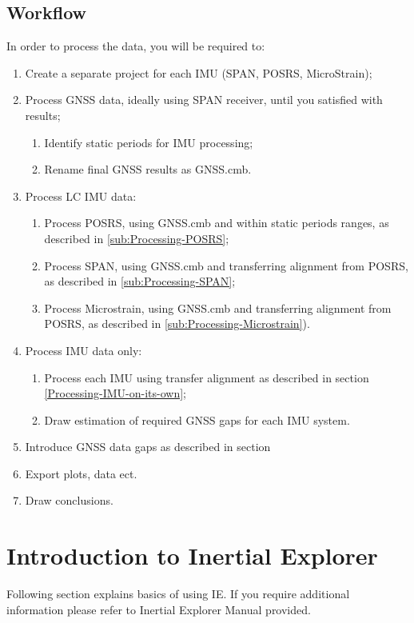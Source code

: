 \documentclass[british,DIV=calc, paper=a4, fontsize=12pt, onecolumn]{scrartcl}
\begin{document}
	
\section{Workflow}
In order to process the data, you will be required to:

\begin{enumerate}
	\item Create a separate project for each IMU (SPAN,	POSRS, MicroStrain);
	\item Process GNSS data, ideally using SPAN receiver, until you satisfied with results;
	\begin{enumerate}
		\item Identify static periods for IMU processing;
		\item Rename final GNSS results as GNSS.cmb.
	\end{enumerate}
	\item Process LC IMU data:
	\begin{enumerate}
		\item Process POSRS, using GNSS.cmb and within static periods ranges, as described in \ref{sub:Processing-POSRS};
		\item Process SPAN, using GNSS.cmb and transferring alignment from POSRS, as described in \ref{sub:Processing-SPAN};
		\item Process Microstrain, using GNSS.cmb and transferring alignment from POSRS, as described in \ref{sub:Processing-Microstrain}).
	\end{enumerate}
	\item Process IMU data only:
	\begin{enumerate}
		\item Process each IMU using transfer alignment as described in section \ref{Processing-IMU-on-its-own};
		\item Draw estimation of required GNSS gaps for each IMU system.
	\end{enumerate}
	\item Introduce GNSS data gaps  as described in section %
	\item Export plots, data ect.
	\item Draw conclusions.
\end{enumerate}



\chapter{Introduction to Inertial Explorer}
Following section explains basics of using IE. If you require additional information please refer to Inertial Explorer Manual provided.
\end{document}
